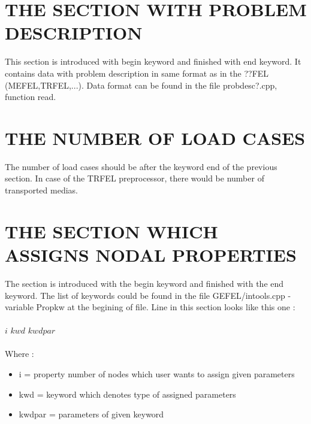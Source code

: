 \documentclass[12pt]{book}
\begin{document}
\section{THE SECTION WITH PROBLEM DESCRIPTION}
This section is introduced with begin keyword and finished with end keyword.
It contains data with problem description in same format as in the ??FEL
(MEFEL,TRFEL,...). Data format can be found in the file probdesc?.cpp, function
read.


\section{THE NUMBER OF LOAD CASES}
The number of load cases should be after the keyword end of the previous section. In case
 of the TRFEL preprocessor, there would be number of transported medias.



\section{THE SECTION WHICH ASSIGNS NODAL PROPERTIES}
The section is introduced with the begin keyword and finished with the end keyword.
The list of keywords could be found in the file GEFEL/intools.cpp - variable Propkw
at the begining of file. Line in this section looks like this one : \\
\\
$i$ $kwd$ $kwdpar$\\
\\
Where :
\begin{itemize}
\item i      = property number of nodes which user wants to assign given parameters
\item kwd    = keyword which denotes type of assigned parameters
\item kwdpar = parameters of given keyword\\ \\
\end{itemize}
\end{document}

